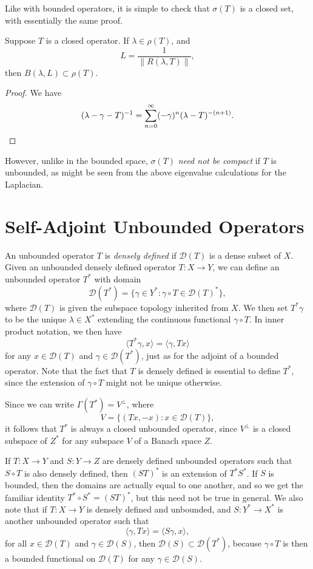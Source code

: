 Like with bounded operators, it is simple to check that $\sigma(T)$ is a closed set, with essentially the same proof.

\begin{lemma}
    Suppose $T$ is a closed operator. If $\lambda \in \rho(T)$, and
    \[ L = \frac{1}{\| R(\lambda,T) \|}, \]
    then $B(\lambda,L) \subset \rho(T)$.
\end{lemma}
\begin{proof}
    We have
    \[ (\lambda - \gamma - T)^{-1} = \sum_{n = 0}^\infty (-\gamma)^n (\lambda - T)^{-(n+1)}. \qedhere \]
\end{proof}

However, unlike in the bounded space, $\sigma(T)$ \emph{need not be compact} if $T$ is unbounded, as might be seen from the above eigenvalue calculations for the Laplacian.








\section{Self-Adjoint Unbounded Operators}

An unbounded operator $T$ is \emph{densely defined} if $\mathcal{D}(T)$ is a dense subset of $X$. Given an unbounded densely defined operator $T: X \to Y$, we can define an unbounded operator $T^*$ with domain
%
\[ \mathcal{D}(T^*) = \{ \gamma \in Y^*: \gamma \circ T \in \mathcal{D}(T)^* \}, \]
%
where $\mathcal{D}(T)$ is given the subspace topology inherited from $X$. We then set $T^* \gamma$ to be the unique $\lambda \in X^*$ extending the continuous functional $\gamma \circ T$. In inner product notation, we then have
%
\[ \langle T^* \gamma, x \rangle = \langle \gamma, Tx \rangle \]
%
for any $x \in \mathcal{D}(T)$ and $\gamma \in \mathcal{D}(T^*)$, just as for the adjoint of a bounded operator. Note that the fact that $T$ is densely defined is essential to define $T^*$, since the extension of $\gamma \circ T$ might not be unique otherwise.

Since we can write $\Gamma(T^*) = V^\perp$, where
%
\[ V = \{ (Tx,-x): x \in \mathcal{D}(T) \}, \]
%
it follows that $T^*$ is always a closed unbounded operator, since $V^\perp$ is a closed subspace of $Z^*$ for any subspace $V$ of a Banach space $Z$.

If $T: X \to Y$ and $S: Y \to Z$ are densely defined unbounded operators such that $S \circ T$ is also densely defined, then $(ST)^*$ is an extension of $T^* S^*$. If $S$ is bounded, then the domains are actually equal to one another, and so we get the familiar identity $T^* \circ S^* = (ST)^*$, but this need not be true in general. We also note that if $T: X \to Y$ is densely defined and unbounded, and $S: Y^* \to X^*$ is another unbounded operator such that
%
\[ \langle \gamma, Tx \rangle = \langle S\gamma, x \rangle, \]
%
for all $x \in \mathcal{D}(T)$ and $\gamma \in \mathcal{D}(S)$, then $\mathcal{D}(S) \subset \mathcal{D}(T^*)$, because $\gamma \circ T$ is then a bounded functional on $\mathcal{D}(T)$ for any $\gamma \in \mathcal{D}(S)$.

